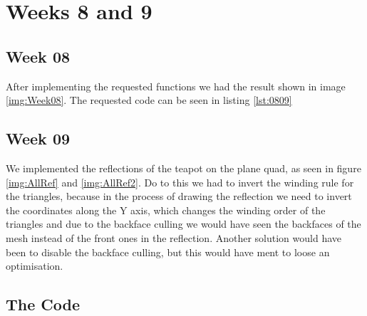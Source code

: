 \chapter{Weeks 8 and 9}

  \section{Week 08}

    After implementing the requested functions we had the result shown in
    image \ref{img:Week08}. The requested code can be seen in listing
    \ref{lst:0809}

  \section{Week 09}

    We implemented the reflections of the teapot on the plane quad, as seen in figure \ref{img:AllRef} and
    \ref{img:AllRef2}.
    Do to this we had to invert the winding rule for the triangles, because in the process
    of drawing the reflection we need to invert the coordinates along the Y axis, which
    changes the winding order of the triangles and due to the backface culling we would have
    seen the backfaces of the mesh instead of the front ones in the reflection. Another solution
    would have been to disable the backface culling, but this would have ment to loose an
    optimisation.



  \section{The Code}

